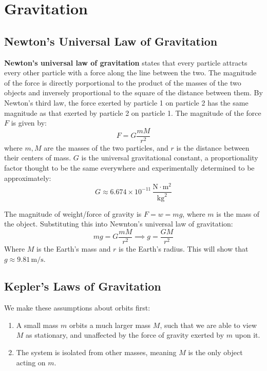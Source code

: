 \documentclass{article}
\newcommand{\theorem}[2]{\begin{tcolorbox}[title={#1},colback=blue!5!white,colframe=blue!75!black,parbox=false] #2 \end{tcolorbox}}
\begin{document}
\section{Gravitation}

\subsection{Newton's Universal Law of Gravitation}

\theorem{Newton's universal law of gravitation}{\textbf{Newton's universal law of gravitation} states that every particle attracts every other particle with a force along the line between the two. The magnitude of the force is directly porportional to the product of the masses of the two objects and inversely proportional to the square of the distance between them. By Newton's third law, the force exerted by particle 1 on particle 2 has the same magnitude as that exerted by particle 2 on particle 1. The magnitude of the force $F$ is given by:
\begin{equation*}
    F=G \frac{mM}{r^2}
\end{equation*}
where $m,M$ are the masses of the two particles, and $r$ is the distance between their centers of mass. $G$ is the universal gravitational constant, a proportionality factor thought to be the same everywhere and experimentally determined to be approximately:
\begin{equation*}
	G\approx 6.674\times 10^{-11} \,\frac{\si{\newton\cdot\meter\squared}}{\si{\kilogram\squared}}
\end{equation*}}

The magnitude of weight/force of gravity is $F=w=mg$, where $m$ is the mass of the object. Substituting this into Newnton's universal law of gravitation:
\begin{equation*}
    mg=G \frac{mM}{r^2}
	\implies 
    g=\frac{GM}{r^2}
\end{equation*}
Where $M$ is the Earth's mass and $r$ is the Earth's radius. This will show that $g\approx 9.81\,\si{\meter\per\second}$.

\subsection{Kepler's Laws of Gravitation}

We make these assumptions about orbits first:
\begin{enumerate}
	\item A small mass $m$ orbits a much larger mass $M$, such that we are able to view $M$ as stationary, and unaffected by the force of gravity exerted by $m$ upon it.
	\item The system is isolated from other masses, meaning $M$ is the only object acting on $m$.
\end{enumerate}
\end{document}
